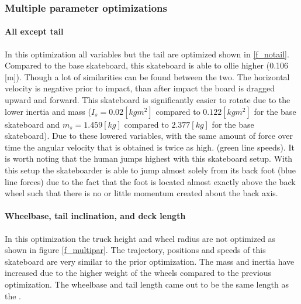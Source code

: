\subsubsection{Multiple parameter optimizations}
\paragraph{All except tail}
\noindent In this optimization all variables but the tail are optimized shown in \ref{f_notail}. Compared to the base skateboard, this skateboard is able to ollie  higher (0.106 [m]). Though a lot of similarities can be found between the two. The horizontal velocity is negative prior to impact, than after impact the board is dragged upward and forward. This skateboard is significantly easier to rotate due to the lower inertia and mass ($I_s = 0.02 [kg m^2]$ compared to $0.122 [kg m^2]$ for the base skateboard and $m_s = 1.459 [kg]$ compared to $2.377 [kg]$ for the base skateboard). Due to these lowered variables, with the same amount of force over time the angular velocity that is obtained is twice as high. (green line speeds). It is worth noting that the human jumps highest with this skateboard setup. 
With this setup the skateboarder is able to jump almost solely from its back foot (blue line forces) due to the fact that the foot is located almost exactly above the back wheel such that there is no or little momentum created about the back axis. 

\newpage

\paragraph{Wheelbase, tail inclination, and deck length}
\noindent In this optimization the truck height and wheel radius are not optimized as shown in figure \ref{f_multipar}. The trajectory, positions and speeds of this skateboard are very similar to the prior optimization. The mass and inertia have increased due to the higher weight of the wheels compared to the previous optimization. The wheelbase and tail length came out to be the same length as the .

